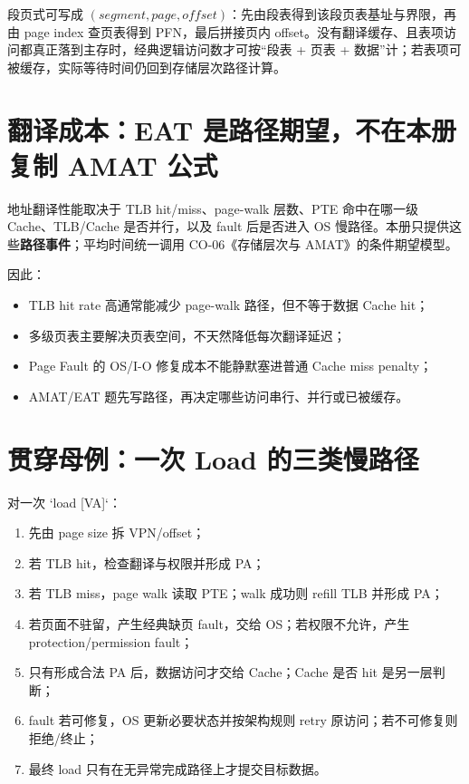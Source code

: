 \documentclass[UTF8,fontset=fandol,11pt,a4paper]{ctexart}
\begin{document}
段页式可写成 $(segment,page,offset)$：先由段表得到该段页表基址与界限，再由 page index 查页表得到 PFN，最后拼接页内 offset。没有翻译缓存、且表项访问都真正落到主存时，经典逻辑访问数才可按“段表 + 页表 + 数据”计；若表项可被缓存，实际等待时间仍回到存储层次路径计算。

\section{翻译成本：EAT 是路径期望，不在本册复制 AMAT 公式}
地址翻译性能取决于 TLB hit/miss、page-walk 层数、PTE 命中在哪一级 Cache、TLB/Cache 是否并行，以及 fault 后是否进入 OS 慢路径。本册只提供这些\textbf{路径事件}；平均时间统一调用 CO-06《存储层次与 AMAT》的条件期望模型。

因此：
\begin{itemize}
\item TLB hit rate 高通常能减少 page-walk 路径，但不等于数据 Cache hit；
\item 多级页表主要解决页表空间，不天然降低每次翻译延迟；
\item Page Fault 的 OS/I-O 修复成本不能静默塞进普通 Cache miss penalty；
\item AMAT/EAT 题先写路径，再决定哪些访问串行、并行或已被缓存。
\end{itemize}

\section{贯穿母例：一次 Load 的三类慢路径}
对一次 `load [VA]`：
\begin{enumerate}
\item 先由 page size 拆 VPN/offset；
\item 若 TLB hit，检查翻译与权限并形成 PA；
\item 若 TLB miss，page walk 读取 PTE；walk 成功则 refill TLB 并形成 PA；
\item 若页面不驻留，产生经典缺页 fault，交给 OS；若权限不允许，产生 protection/permission fault；
\item 只有形成合法 PA 后，数据访问才交给 Cache；Cache 是否 hit 是另一层判断；
\item fault 若可修复，OS 更新必要状态并按架构规则 retry 原访问；若不可修复则拒绝/终止；
\item 最终 load 只有在无异常完成路径上才提交目标数据。
\end{enumerate}
\end{document}
